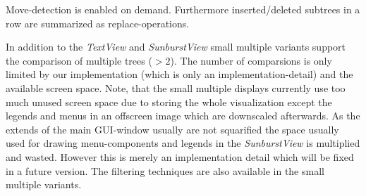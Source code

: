 Move-detection is enabled on demand. Furthermore inserted/deleted subtrees in a row are summarized as replace-operations.

In addition to the \emph{TextView} and \emph{SunburstView} small multiple variants support the comparison of multiple trees ($>2$). The number of comparsions is only limited by our implementation (which is only an implementation-detail) and the available screen space. Note, that the small multiple displays currently use too much unused screen space due to storing the whole visualization except the legends and menus in an offscreen image which are downscaled afterwards. As the extends of the main GUI-window usually are not squarified the space usually used for drawing menu-components and legends in the \emph{SunburstView} is multiplied and wasted. However this is merely an implementation detail which will be fixed in a future version. The filtering techniques are also available in the small multiple variants.








